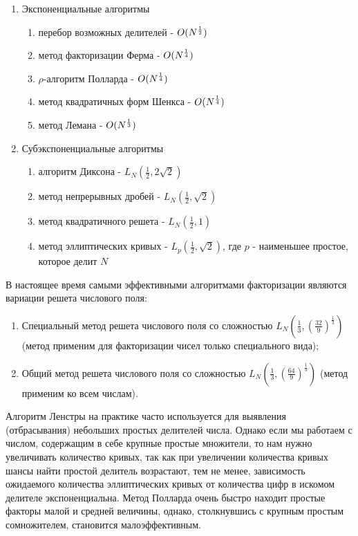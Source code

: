     \begin{enumerate}
     \item Экспоненциальные алгоритмы
     
	\begin{enumerate}
	 \item перебор возможных делителей - {$O(N\textsuperscript{{$\frac{1}{2}$}})$}
	 \item метод факторизации Ферма - {$O(N\textsuperscript{{$\frac{1}{4}$}})$}
	 \item {$\rho$}-алгоритм Полларда - {$O(N\textsuperscript{{$\frac{1}{4}$}})$}
	 \item метод квадратичных форм Шенкса - {$O(N\textsuperscript{{$\frac{1}{4}$}})$}
	 \item метод Лемана - {$O(N\textsuperscript{{$\frac{1}{3}$}})$}
	\end{enumerate}
     
     \item Субэкспоненциальные алгоритмы
     
	\begin{enumerate}
	 \item алгоритм Диксона - {$L_N(\frac{1}{2}, 2\sqrt{2})$}
	 \item метод непрерывных дробей - {$L_N(\frac{1}{2}, \sqrt{2})$}
	 \item метод квадратичного решета - {$L_N(\frac{1}{2}, 1)$}	 
	 \item метод эллиптических кривых - {$L_p(\frac{1}{2}, \sqrt{2})$}, где {$p$} - наименьшее простое, которое делит {$N$}
	\end{enumerate}

    \end{enumerate}
    
    В настоящее время самыми эффективными алгоритмами факторизации являются вариации решета числового поля:
    
      \begin{enumerate}
       \item Специальный метод решета числового поля со сложностью {$L_N(\frac{1}{3}, (\frac{32}{9})^\frac{1}{3})$} 
	(метод применим для факторизации чисел только специального вида);
       \item Общий метод решета числового поля со сложностью {$L_N(\frac{1}{3}, (\frac{64}{9})^\frac{1}{3})$} 
	(метод применим ко всем числам).
      \end{enumerate}      
      
  Алгоритм Ленстры на практике часто используется для выявления (отбрасывания) небольших простых делителей числа. Однако если мы 
  работаем с числом, содержащим в себе крупные простые множители, то нам нужно увеличивать количество кривых, так как при увеличении 
  количества кривых шансы найти простой делитель возрастают, тем не менее, зависимость ожидаемого количества эллиптических кривых от 
  количества цифр в искомом делителе экспоненциальна. Метод Полларда очень быстро находит простые факторы малой и средней величины, однако,
  столкнувшись с крупным простым сомножителем, становится малоэффективным.
  
